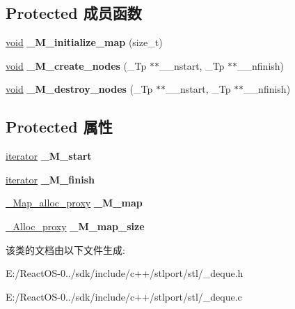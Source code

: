 \subsection*{Protected 成员函数}
\begin{DoxyCompactItemize}
\item 
\mbox{\label{class___deque__base_a18003bb14854cb98e607c5214c080872}} 
\hyperlink{interfacevoid}{void} {\bfseries \+\_\+\+M\+\_\+initialize\+\_\+map} (size\+\_\+t)
\item 
\mbox{\label{class___deque__base_a2a759941bd020c89ed894112261fdcd5}} 
\hyperlink{interfacevoid}{void} {\bfseries \+\_\+\+M\+\_\+create\+\_\+nodes} (\+\_\+\+Tp $\ast$$\ast$\+\_\+\+\_\+nstart, \+\_\+\+Tp $\ast$$\ast$\+\_\+\+\_\+nfinish)
\item 
\mbox{\label{class___deque__base_a76c378290d7e6301d294d1e30407f3bb}} 
\hyperlink{interfacevoid}{void} {\bfseries \+\_\+\+M\+\_\+destroy\+\_\+nodes} (\+\_\+\+Tp $\ast$$\ast$\+\_\+\+\_\+nstart, \+\_\+\+Tp $\ast$$\ast$\+\_\+\+\_\+nfinish)
\end{DoxyCompactItemize}
\subsection*{Protected 属性}
\begin{DoxyCompactItemize}
\item 
\mbox{\label{class___deque__base_adb358d98cf30e81c0165786fb9a4f753}} 
\hyperlink{struct___deque__iterator}{iterator} {\bfseries \+\_\+\+M\+\_\+start}
\item 
\mbox{\label{class___deque__base_ac44b45a9d74e1c5a7c884e6ecf236a55}} 
\hyperlink{struct___deque__iterator}{iterator} {\bfseries \+\_\+\+M\+\_\+finish}
\item 
\mbox{\label{class___deque__base_a9240f2f4fd6981e33a35a22760be9d0e}} 
\hyperlink{class___s_t_l_p__alloc__proxy}{\+\_\+\+Map\+\_\+alloc\+\_\+proxy} {\bfseries \+\_\+\+M\+\_\+map}
\item 
\mbox{\label{class___deque__base_acaffe77c282d5bdbd02723649c315d73}} 
\hyperlink{class___s_t_l_p__alloc__proxy}{\+\_\+\+Alloc\+\_\+proxy} {\bfseries \+\_\+\+M\+\_\+map\+\_\+size}
\end{DoxyCompactItemize}


该类的文档由以下文件生成\+:\begin{DoxyCompactItemize}
\item 
E\+:/\+React\+O\+S-\/0../sdk/include/c++/stlport/stl/\+\_\+deque.\+h\item 
E\+:/\+React\+O\+S-\/0../sdk/include/c++/stlport/stl/\+\_\+deque.\+c\end{DoxyCompactItemize}
